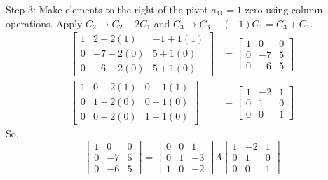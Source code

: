 \documentclass{article}
\begin{document}
Step 3: Make elements to the right of the pivot $a_{11}=1$ zero using column operations.
Apply $C_2 \to C_2 - 2C_1$ and $C_3 \to C_3 - (-1)C_1 = C_3 + C_1$.
\begin{align*} \begin{bmatrix} 1 & 2 - 2(1) & -1 + 1(1) \\ 0 & -7 - 2(0) & 5 + 1(0) \\ 0 & -6 - 2(0) & 5 + 1(0) \end{bmatrix} &= \begin{bmatrix} 1 & 0 & 0 \\ 0 & -7 & 5 \\ 0 & -6 & 5 \end{bmatrix} \\ \begin{bmatrix} 1 & 0 - 2(1) & 0 + 1(1) \\ 0 & 1 - 2(0) & 0 + 1(0) \\ 0 & 0 - 2(0) & 1 + 1(0) \end{bmatrix} &= \begin{bmatrix} 1 & -2 & 1 \\ 0 & 1 & 0 \\ 0 & 0 & 1 \end{bmatrix}\end{align*}
So,
\[ \begin{bmatrix} 1 & 0 & 0 \\ 0 & -7 & 5 \\ 0 & -6 & 5 \end{bmatrix} = \begin{bmatrix} 0 & 0 & 1 \\ 0 & 1 & -3 \\ 1 & 0 & -2 \end{bmatrix} A \begin{bmatrix} 1 & -2 & 1 \\ 0 & 1 & 0 \\ 0 & 0 & 1 \end{bmatrix} \]
\end{document}
